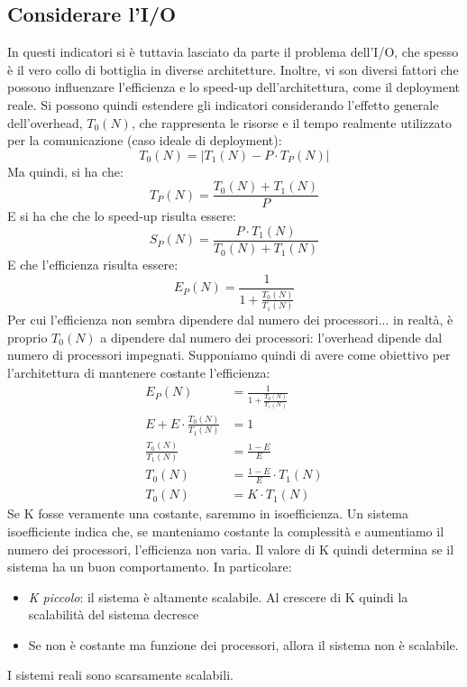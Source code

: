 \subsection{Considerare l'I/O}
In questi indicatori si è tuttavia lasciato da parte il problema dell'I/O, che spesso è il vero collo di bottiglia in
diverse architetture. Inoltre, vi son diversi fattori che possono influenzare l'efficienza e lo speed-up
dell'architettura, come il deployment reale. Si possono quindi estendere gli indicatori considerando l'effetto 
generale dell'overhead, $T_0(N)$, che rappresenta le risorse e il tempo realmente utilizzato per la comunicazione 
(caso ideale di deployment):
\begin{equation}
T_0(N) = \left|T_1(N) - P \cdot T_P(N)\right|
\end{equation}
Ma quindi, si ha che:
\begin{equation}
 T_P(N) = \frac{T_0(N) + T_1(N)}{P}
\end{equation}
E si ha che che lo speed-up risulta essere:
\begin{equation}
 S_P(N) = \frac{P \cdot T_1(N)}{T_0(N) + T_1(N)}
\end{equation}
E che l'efficienza risulta essere:
\begin{equation}
E_P(N) = \frac{1}{1 + \frac{T_0(N)}{T_1(N)}}
\end{equation}
Per cui l'efficienza non sembra dipendere dal numero dei processori... in realtà,
è proprio $T_0(N)$ a dipendere dal numero dei processori: l'overhead dipende dal numero di processori impegnati.
Supponiamo quindi di avere come obiettivo per l'architettura di mantenere costante l'efficienza:
\begin{align}
                            E_P(N) &= \frac{1}{1 + \frac{T_0(N)}{T_1(N)}} \nonumber \\
 E + E \cdot \frac{T_0(N)}{T_1(N)} &= 1                                   \nonumber \\
             \frac{T_0(N)}{T_1(N)} &= \frac{1 - E}{E}                     \nonumber \\
                            T_0(N) &= \frac{1 - E}{E} \cdot T_1(N)        \nonumber \\
                            T_0(N) &= K \cdot T_1(N)
\end{align}
Se K fosse veramente una costante, saremmo in isoefficienza. Un sistema isoefficiente indica che, se manteniamo 
costante la complessità e aumentiamo il numero dei processori, l'efficienza non varia. Il valore di K quindi determina
se il sistema ha un buon comportamento. In particolare:
\begin{itemize}
 \item \textit{K piccolo}: il sistema è altamente scalabile. Al crescere di K quindi la scalabilità del sistema decresce
 \item Se non è costante ma funzione dei processori, allora il sistema non è scalabile.
\end{itemize}
I sistemi reali sono scarsamente scalabili.

